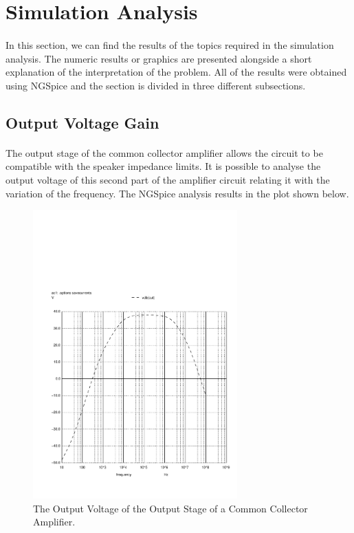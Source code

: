 \pagebreak

\section{Simulation Analysis}
\label{sec:simulation}

\paragraph{}
In this section, we can find the results of the topics required in the simulation analysis. The numeric results or graphics are presented alongside a short explanation of the interpretation of the problem. All of the results were obtained using NGSpice and the section is divided in three different subsections. 

\subsection{Output Voltage Gain}

\paragraph{}
The output stage of the common collector amplifier allows the circuit to be compatible with the speaker impedance limits. It is possible to analyse the output voltage of this second part of the amplifier circuit relating it with the variation of the frequency. The NGSpice analysis results in the plot shown below.


\begin{figure}[H]\centering
\includegraphics[trim= 0cm 0cm 0cm 10cm, clip, width=0.7\textwidth]{vo2f.pdf}
\caption{The Output Voltage of the Output Stage of a Common Collector Amplifier.}
\label{fig:sim_output}
\end{figure}

